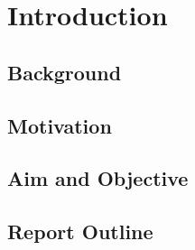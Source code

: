 
\chapter[Introduction]{\centering Introduction}\label{chap1}
\newpage

\section{Background}

\section{Motivation}

\section{Aim and Objective}



\section{Report Outline}


